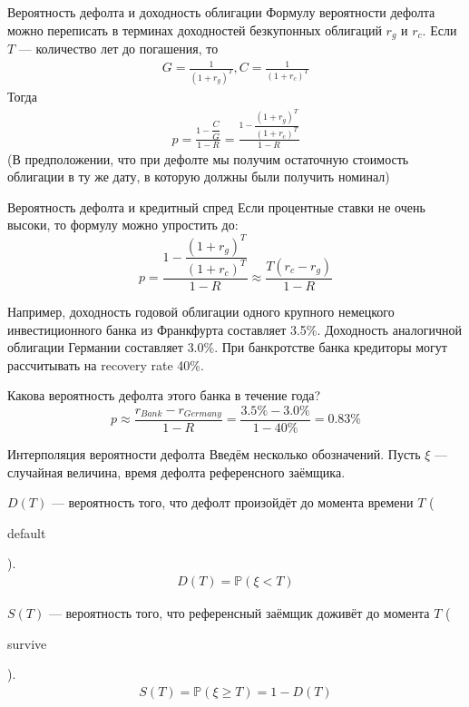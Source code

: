 \documentclass{beamer}
\newcommand{\en}[1]{\begin{otherlanguage}{english}#1\end{otherlanguage}}
\begin{document}
\begin{frame}{Вероятность дефолта и доходность облигации}
\justify
Формулу вероятности дефолта можно переписать в терминах доходностей безкупонных облигаций $r_g$ и $r_c$. Если $T$ --- количество лет до погашения, то
\begin{align*}
G = \frac{1}{(1 + r_g)^T}, C = \frac{1}{(1 + r_c)^T}
\end{align*}
Тогда
\begin{align*}
p = \frac{1 - \dfrac{C}{G}}{1-R} = \frac{1 - \dfrac{(1 + r_g)^T}{(1 + r_c)^T}}{1 - R}
\end{align*}
(В предположении, что при дефолте мы получим остаточную стоимость облигации в ту же дату, в которую должны были получить номинал)
\end{frame}



\begin{frame}{Вероятность дефолта и кредитный спред}
\justify
Если процентные ставки не очень высоки, то формулу можно упростить до:
\begin{equation*}
p = \frac{1 - \dfrac{(1 + r_g)^T}{(1 + r_c)^T}}{1 - R} \approx \frac{T(r_c - r_g)}{1 - R}
\end{equation*}

\justify
Например, доходность годовой облигации одного крупного немецкого инвестиционного банка из Франкфурта составляет 3.5\%. Доходность аналогичной облигации Германии составляет $3.0\%$. При банкротстве банка кредиторы могут рассчитывать на recovery rate 40\%.

\justify
Какова вероятность дефолта этого банка в течение года?
\begin{equation*}
p \approx \frac{r_{Bank} - r_{Germany}}{1-R} = \frac{3.5\% - 3.0\%}{1-40\%} = 0.83\%
\end{equation*}
\end{frame}



\begin{frame}{Интерполяция вероятности дефолта}
\justify
Введём несколько обозначений. Пусть $\xi$ --- случайная величина, время дефолта референсного заёмщика.

\justify
$D(T)$ --- вероятность того, что дефолт произойдёт до момента времени $T$ (\en{default}).
\begin{align*}
D(T) = \mathbb{P}(\xi < T)
\end{align*}

\justify
$S(T)$ --- вероятность того, что референсный заёмщик доживёт до момента $T$ (\en{survive}).
\begin{align*}
S(T) = \mathbb{P}(\xi \ge T) = 1 - D(T)
\end{align*}
\end{frame}
\end{document}
